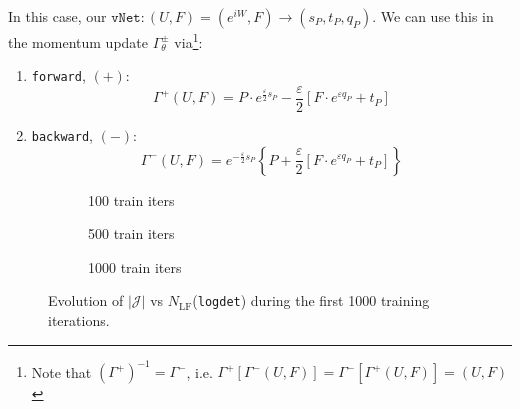 \documentclass[a4paper,11pt]{article}
\begin{document}
In this case, our $\texttt{vNet}: (U, F) = (e^{iW}, F) \rightarrow (s_{P}, t_{P}, q_{P})$.
%
We can use this in the momentum update $\Gamma^{\pm}_{\theta}$ via\footnote{Note that $\left(\Gamma^{+}\right)^{-1} = \Gamma^{-}$, i.e. $\Gamma^{+}\left[\Gamma^{-}(U, F)\right] = \Gamma^{-}\left[\Gamma^{+}(U, F)\right] = (U, F)$}:
%
\begin{enumerate}
    \item \texttt{forward}, $(+)$:
    \begin{equation}
        \Gamma^{+}(U, F) = P \cdot e^{\frac{\varepsilon}{2} s_{P}} - \frac{\varepsilon}{2}\left[ F \cdot e^{\varepsilon q_{P}} + t_{P} \right]
    \end{equation}
    \item \texttt{backward}, $(-)$:
    \begin{equation}
        \Gamma^{-}(U, F) = e^{-\frac{\varepsilon}{2} s_{P}} \left\{P + \frac{\varepsilon}{2} \left[ F \cdot e^{\varepsilon q_{P}} + t_{P} \right] \right\}
    \end{equation}
\end{enumerate}
%
\begin{figure}[htpb!]
    \centering
    \begin{subfigure}{0.31\textwidth}
        
        \caption{\label{subfig:logdet1} 100 train iters}
    \end{subfigure}
    \hfill
    \begin{subfigure}{0.31\textwidth}
        
        \caption{\label{subfig:logdet2} 500 train iters}
    \end{subfigure}
    \hfill
    \begin{subfigure}{0.31\textwidth}
        
        \caption{\label{subfig:logdet3} 1000 train iters}
    \end{subfigure}
    \caption{\label{fig:logdet}Evolution of $\left|\mathcal{J}\right|$ vs $N_{\mathrm{LF}}$(\texttt{logdet}) during the first 1000 training iterations.}
\end{figure}


\end{document}
